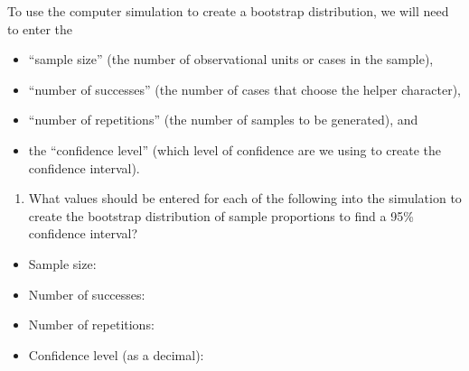 \documentclass[
]{report}
\providecommand{\tightlist}{%
  \setlength{\itemsep}{0pt}\setlength{\parskip}{0pt}}
\begin{document}
To use the computer simulation to create a bootstrap distribution, we will need to enter the

\begin{itemize}
\tightlist
\item
  ``sample size'' (the number of observational units or cases in the sample),
\item
  ``number of successes'' (the number of cases that choose the helper character),
\item
  ``number of repetitions'' (the number of samples to be generated), and
\item
  the ``confidence level'' (which level of confidence are we using to create the confidence interval).
\end{itemize}

\begin{enumerate}
\def\labelenumi{\arabic{enumi}.}
\setcounter{enumi}{3}
\tightlist
\item
  What values should be entered for each of the following into the simulation to create the bootstrap distribution of sample proportions to find a 95\% confidence interval?
  \vspace{1mm}
\end{enumerate}

\begin{itemize}
\tightlist
\item
  Sample size:
\end{itemize}

\vspace{.15in}

\begin{itemize}
\tightlist
\item
  Number of successes:
\end{itemize}

\vspace{.15in}

\begin{itemize}
\tightlist
\item
  Number of repetitions:
\end{itemize}

\vspace{.15in}

\begin{itemize}
\tightlist
\item
  Confidence level (as a decimal):
\end{itemize}

\vspace{.15in}
\end{document}
